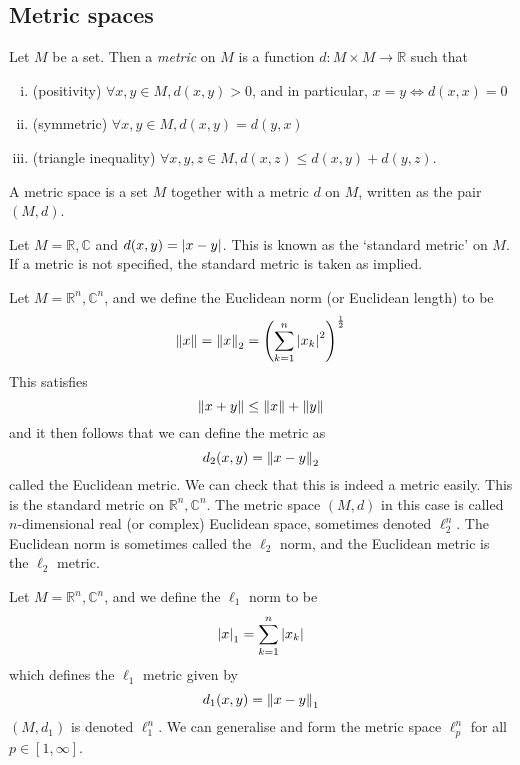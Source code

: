 \subsection{Metric spaces}
\begin{definition}
	Let \( M \) be a set.
	Then a \textit{metric} on \( M \) is a function \( d \colon M \times M \to \mathbb R \) such that
	\begin{enumerate}[(i)]
		\item (positivity) \( \forall x,y \in M, d(x,y) > 0 \), and in particular, \( x = y \iff d(x,x) = 0 \)
		\item (symmetric) \( \forall x,y \in M, d(x,y) = d(y,x) \)
		\item (triangle inequality) \( \forall x,y,z \in M, d(x,z) \leq d(x,y) + d(y,z) \).
	\end{enumerate}
	A metric space is a set \( M \) together with a metric \( d \) on \( M \), written as the pair \( (M, d) \).
\end{definition}
\begin{example}
	Let \( M = \mathbb R, \mathbb C \) and \( d(x,y) = \abs{x-y} \).
	This is known as the `standard metric' on \( M \).
	If a metric is not specified, the standard metric is taken as implied.
\end{example}
\begin{example}
	Let \( M = \mathbb R^n, \mathbb C^n \), and we define the Euclidean norm (or Euclidean length) to be
	\[
		\norm{x} = \norm{x}_2 = \qty(\sum_{k=1}^n \abs{x_k}^2)^{\frac{1}{2}}
	\]
	This satisfies
	\[
		\norm{x+y} \leq \norm{x} + \norm{y}
	\]
	and it then follows that we can define the metric as
	\[
		d_2(x,y) = \norm{x-y}_2
	\]
	called the Euclidean metric.
	We can check that this is indeed a metric easily.
	This is the standard metric on \( \mathbb R^n, \mathbb C^n \).
	The metric space \( (M, d) \) in this case is called \( n \)-dimensional real (or complex) Euclidean space, sometimes denoted \( \ell_2^n \).
	The Euclidean norm is sometimes called the \( \ell_2 \) norm, and the Euclidean metric is the \( \ell_2 \) metric.
\end{example}
\begin{example}
	Let \( M = \mathbb R^n, \mathbb C^n \), and we define the \( \ell_1 \) norm to be
	\[
		\abs{x}_1 = \sum_{k=1}^n \abs{x_k}
	\]
	which defines the \( \ell_1 \) metric given by
	\[
		d_1(x,y) = \norm{x-y}_1
	\]
	\( (M, d_1) \) is denoted \( \ell_1^n \).
	We can generalise and form the metric space \( \ell_p^n \) for all \( p \in [1, \infty] \).
\end{example}
